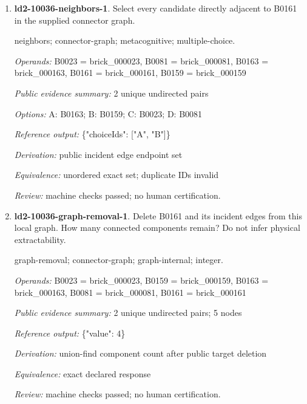 \begin{enumerate}
\par{\small interface; connector-graph; metacognitive; single-choice.\par\textit{Operands:} B0094 = brick\_000094, B0090 = brick\_000090\par\textit{Public evidence summary:} \{"connectorRecord": \{"family": "stud", "aConnector": 8, "bConnector": 3\}, "scope": "Upstream connector tolerances and inset mesh intersections; unknown parts remain explicit, separate scene objects are not glued together; no load/force validation."\}\par\textit{Options:} A: stud; B: axle; C: hinge; D: fixed; E: ball\par\textit{Reference output:} \{"choiceId": "A"\}\par\textit{Derivation:} public connectorRecord.family equality\par\textit{Equivalence:} exact declared response\par\textit{Review:} machine checks passed; no human certification.}
\item \textbf{ld2-10036-neighbors-1}. Select every candidate directly adjacent to B0161 in the supplied connector graph.
\par{\small neighbors; connector-graph; metacognitive; multiple-choice.\par\textit{Operands:} B0023 = brick\_000023, B0081 = brick\_000081, B0163 = brick\_000163, B0161 = brick\_000161, B0159 = brick\_000159\par\textit{Public evidence summary:} 2 unique undirected pairs\par\textit{Options:} A: B0163; B: B0159; C: B0023; D: B0081\par\textit{Reference output:} \{"choiceIds": ["A", "B"]\}\par\textit{Derivation:} public incident edge endpoint set\par\textit{Equivalence:} unordered exact set; duplicate IDs invalid\par\textit{Review:} machine checks passed; no human certification.}
\item \textbf{ld2-10036-graph-removal-1}. Delete B0161 and its incident edges from this local graph. How many connected components remain? Do not infer physical extractability.
\par{\small graph-removal; connector-graph; graph-internal; integer.\par\textit{Operands:} B0023 = brick\_000023, B0159 = brick\_000159, B0163 = brick\_000163, B0081 = brick\_000081, B0161 = brick\_000161\par\textit{Public evidence summary:} 2 unique undirected pairs; 5 nodes\par\textit{Reference output:} \{"value": 4\}\par\textit{Derivation:} union-find component count after public target deletion\par\textit{Equivalence:} exact declared response\par\textit{Review:} machine checks passed; no human certification.}

\end{enumerate}
